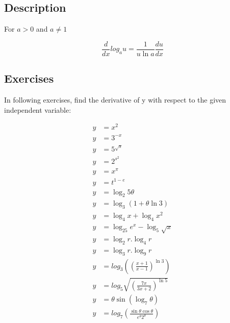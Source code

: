 \documentclass{article}
\begin{document}
\thispagestyle{empty}

\subsection*{Description}
\noindent
For $a > 0$ and $a \neq 1$
\newline

\begin{equation*}
\frac{d}{dx} log_a u = \frac{1}{u \ln a} \frac{du}{dx}
\end{equation*}

\subsection*{Exercises}
\noindent
In following exercises, find the derivative of y with respect to the given independent variable:
\newline

\begin{align*}
    y &= x^{2} \\
    y &= 3^{-x} \\
    y &= 5^{\sqrt{s}} \\
    y &= 2^{s^{2}} \\
    y &= x^{\pi} \\
    y &= t^{1-e} \\
    y &= \log_{2}5\theta \\
    y &= \log_{3}\left(1+\theta\ln{3}\right) \\
    y &= \log_{4}x + \log_{4}x^{2} \\
    y &= \log_{25}e^{x} - \log_{5}\sqrt{x} \\
    y &= \log_{2}r.\log_{4}r \\
    y &= \log_{3}r.\log_{9}r \\
    y &= log_{3}\left(\left(\frac{x+1}{x-1}\right)^{\ln{3}}\right) \\
    y &= log_{5}\sqrt{\left(\frac{7x}{3x+2}\right)^{\ln{5}}} \\
    y &= \theta\sin{\left(\log_{7}\theta\right)} \\
    y &= log_{7}\left(\frac{\sin{\theta}\cos{\theta}}{e^{\theta}2^{\theta}}\right)
\end{align*}
\end{document}
